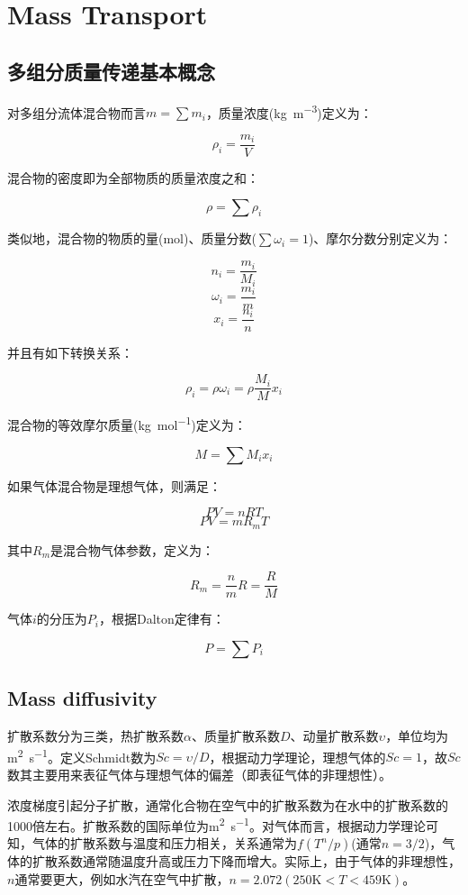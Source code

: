 \chapter{Mass Transport}

\section{多组分质量传递基本概念}

对多组分流体混合物而言$ m=\sum m_i $，质量浓度(\si{\kilogram\per\meter\cubed})定义为：

\[\rho_i = \frac{m_i}{V} \]

混合物的密度即为全部物质的质量浓度之和：

\[\rho = \sum\rho_i \]

类似地，混合物的物质的量(\si{\mole})、质量分数($ \sum \omega_i = 1 $)、摩尔分数分别定义为：

\[ n_i=\frac{m_i}{M_i} \]
\[ \omega_i = \frac{m_i}{m} \]
\[ x_i = \frac{n_i}{n} \]

并且有如下转换关系：

\[\rho_i = \rho\omega_i = \rho\frac{M_i}{M}x_i \]

混合物的等效摩尔质量(\si{\kilogram\per\mole})定义为：

\[ M = \sum M_i x_i \]

如果气体混合物是理想气体，则满足：

\[ PV=nRT \]
\[ PV=mR_m T \]

其中$ R_m $是混合物气体参数，定义为：

\[ R_m = \frac{n}{m}R = \frac{R}{M} \]

气体$ i $的分压为$ P_i $，根据Dalton定律有：

\[ P=\sum P_i \]

\section{Mass diffusivity}
扩散系数分为三类，热扩散系数$ \alpha $、质量扩散系数$ D $、动量扩散系数$ \upsilon $，单位均为\si{\square\meter\per\second}。定义Schmidt数为$ Sc=\upsilon/D $，根据动力学理论，理想气体的$ Sc=1 $，故$ Sc $数其主要用来表征气体与理想气体的偏差（即表征气体的非理想性）。

浓度梯度引起分子扩散，通常化合物在空气中的扩散系数为在水中的扩散系数的1000倍左右。扩散系数的国际单位为\si{\square\meter\per\second}。对气体而言，根据动力学理论可知，气体的扩散系数与温度和压力相关，关系通常为$ f(T^n/p) $(通常$ n=3/2 $)，气体的扩散系数通常随温度升高或压力下降而增大。实际上，由于气体的非理想性，$ n $通常要更大，例如水汽在空气中扩散，$ n=2.072(250\si{\kelvin}<T<459\si{\kelvin}) $。

